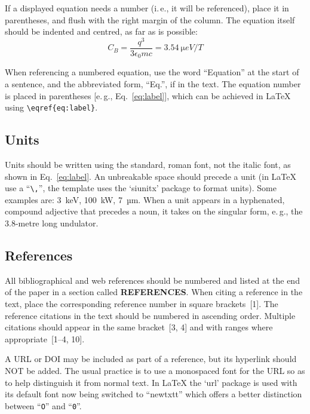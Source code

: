 \documentclass[a4paper,
               keeplastbox,   %
               ]{jacow}
\begin{document}
If a displayed equation needs a number (i.\,e., it will be
referenced), place it in parentheses, and flush with the
right margin of the column. The equation itself should be
indented and centred, as far as is possible:
\begin{equation}\label{eq:label}
    C_B=\frac{q^3}{3\epsilon_{0} mc}=\SI{3.54}{\micro eV/T}
\end{equation}

When referencing a numbered equation, use the word
“Equation” at the start of a sentence, and the abbreviated
form, “Eq.”, if in the text. The equation number is placed
in parentheses [e.\,g., Eq.~\eqref{eq:label}], which can be 
achieved in \LaTeX{} using \verb|\eqref{eq:label}|.

\subsection{Units}
	
Units should be written using the standard, roman font,
not the italic font, as shown in Eq.~\eqref{eq:label}.
An unbreakable space should precede a unit (in \LaTeX{} use a “\verb|\,|”,
the template uses the ‘siunitx’ package to format units).
Some examples are: \SI{3}{keV},
\SI{100}{kW}, \SI{7}{µm}. When a unit appears in a hyphenated,
compound adjective that precedes a noun, it takes on the
singular form, e.\,g., the 3.8-metre long undulator.

\subsection{References}
%
%
All bibliographical and web references should be numbered and listed at the
end of the paper in a section called \textbf{REFERENCES}. When citing a
reference in the text, place the corresponding reference number in square
brackets~[1]. The reference citations in the text should be numbered
in ascending order. Multiple citations should appear in
the same bracket~[3, 4] and
with ranges where appropriate~[1--4, 10].

A URL or DOI may be included as part of a reference, but its
hyperlink should NOT be added. The usual practice is to
use a monospaced font for the URL so as to help distinguish
it from normal text. In \LaTeX{} the ‘url’ package is used with its 
default font now being switched to ``newtxtt'' which offers
a better distinction between ``\texttt{O}'' and ``\texttt{0}''.
\end{document}
